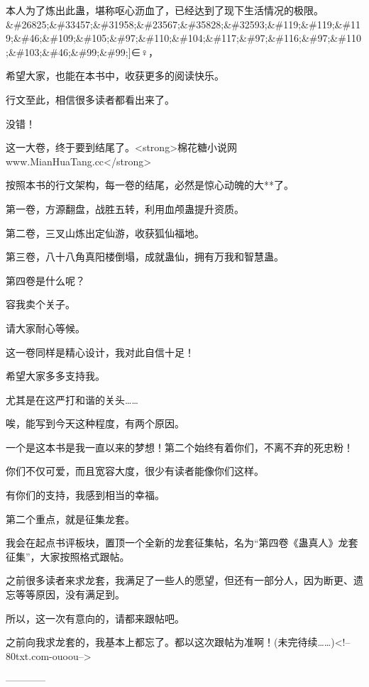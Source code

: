 \begin{this_body}
本人为了炼出此蛊，堪称呕心沥血了，已经达到了现下生活情况的极限。\&\#26825;\&\#33457;\&\#31958;\&\#23567;\&\#35828;\&\#32593;\&\#119;\&\#119;\&\#119;\&\#46;\&\#109;\&\#105;\&\#97;\&\#110;\&\#104;\&\#117;\&\#97;\&\#116;\&\#97;\&\#110;\&\#103;\&\#46;\&\#99;\&\#99;]∈♀，

希望大家，也能在本书中，收获更多的阅读快乐。

行文至此，相信很多读者都看出来了。

没错！

这一大卷，终于要到结尾了。<strong>棉花糖小说网www.MianHuaTang.cc</strong>

按照本书的行文架构，每一卷的结尾，必然是惊心动魄的大**了。

第一卷，方源翻盘，战胜五转，利用血颅蛊提升资质。

第二卷，三叉山炼出定仙游，收获狐仙福地。

第三卷，八十八角真阳楼倒塌，成就蛊仙，拥有万我和智慧蛊。

第四卷是什么呢？

容我卖个关子。

请大家耐心等候。

这一卷同样是精心设计，我对此自信十足！

希望大家多多支持我。

尤其是在这严打和谐的关头……

唉，能写到今天这种程度，有两个原因。

一个是这本书是我一直以来的梦想！第二个始终有着你们，不离不弃的死忠粉！

你们不仅可爱，而且宽容大度，很少有读者能像你们这样。

有你们的支持，我感到相当的幸福。

第二个重点，就是征集龙套。

我会在起点书评板块，置顶一个全新的龙套征集帖，名为“第四卷《蛊真人》龙套征集”，大家按照格式跟帖。

之前很多读者来求龙套，我满足了一些人的愿望，但还有一部分人，因为断更、遗忘等等原因，没有满足到。

所以，这一次有意向的，请都来跟帖吧。

之前向我求龙套的，我基本上都忘了。都以这次跟帖为准啊！(未完待续……)<!--80txt.com-ouoou-->

------------

\end{this_body}

